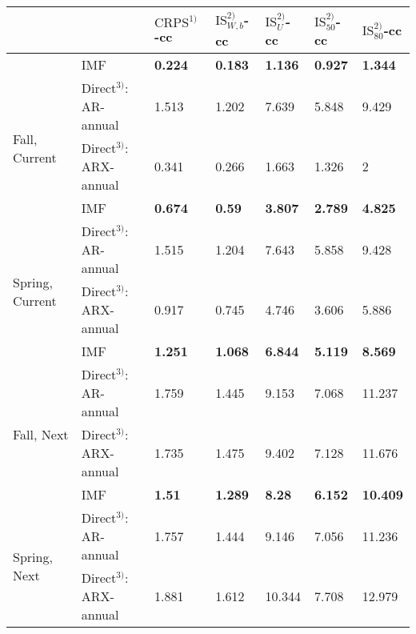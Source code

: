 \begin{table}[!h]
\centering
\begin{tabular}{lllllll}
\toprule
 &  & $\text{CRPS}^{1)}$-cc & $\text{IS}_{W,b}^{2)}$-cc & $\text{IS}_{U}^{2)}$-cc & $\text{IS}_{50}^{2)}$-cc & $\text{IS}_{80}^{2)}$-cc\\
\midrule
 & IMF & \textbf{0.224} & \textbf{0.183} & \textbf{1.136} & \textbf{0.927} & \textbf{1.344}\\
\multirow{3}{*}{Fall, Current}
 & Direct$^{3)}$: AR-annual & 1.513 & 1.202 & 7.639 & 5.848 & 9.429\\
 & Direct$^{3)}$: ARX-annual & 0.341 & 0.266 & 1.663 & 1.326 & 2\\
\addlinespace
 & IMF & \textbf{0.674} & \textbf{0.59} & \textbf{3.807} & \textbf{2.789} & \textbf{4.825}\\
\multirow{3}{*}{Spring, Current}
 & Direct$^{3)}$: AR-annual & 1.515 & 1.204 & 7.643 & 5.858 & 9.428\\
 & Direct$^{3)}$: ARX-annual & 0.917 & 0.745 & 4.746 & 3.606 & 5.886\\
\addlinespace
 & IMF & \textbf{1.251} & \textbf{1.068} & \textbf{6.844} & \textbf{5.119} & \textbf{8.569}\\
\multirow{3}{*}{Fall, Next}
 & Direct$^{3)}$: AR-annual & 1.759 & 1.445 & 9.153 & 7.068 & 11.237\\
 & Direct$^{3)}$: ARX-annual & 1.735 & 1.475 & 9.402 & 7.128 & 11.676\\
\addlinespace
 & IMF & \textbf{1.51} & \textbf{1.289} & \textbf{8.28} & \textbf{6.152} & \textbf{10.409}\\
\multirow{3}{*}{Spring, Next}
 & Direct$^{3)}$: AR-annual & 1.757 & 1.444 & 9.146 & 7.056 & 11.236\\
 & Direct$^{3)}$: ARX-annual & 1.881 & 1.612 & 10.344 & 7.708 & 12.979\\
\bottomrule
\end{tabular}
\end{table}

